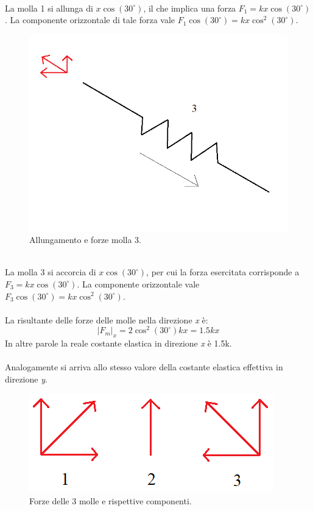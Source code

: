 \\
La molla 1 si allunga di $x\cos(30^\circ)$, il che implica una forza $F_{1}=k x\cos(30^\circ)$. La componente orizzontale di tale forza vale $F_{1}\cos(30^\circ)=k x\cos^2(30^\circ)$.
\\
\begin{figure}[h]
    \centering
    \includegraphics[scale=0.4]{Immagini/Molla 3.png}
    \caption{Allungamento e forze molla 3.}
    \label{Molla3}
\end{figure}
\\
La molla 3 si accorcia di $x\cos(30^\circ)$, per cui la forza esercitata corrisponde a $F_{3}=k x\cos(30^\circ)$. La componente orizzontale vale $F_{3}\cos(30^\circ)=k x\cos^2(30^\circ)$.
\\\\
La risultante delle forze delle molle nella direzione \textit {x} è:
\begin{equation}
    |F_m|_x=2\cos^2(30^{\circ})k x=1.5k x
\end{equation}
In altre parole la reale costante elastica in direzione \textit {x} è 1.5k.
\\\\
Analogamente si arriva allo stesso valore della costante elastica effettiva in direzione \textit {y}.
\\
\begin{figure}[h]
    \centering
    \includegraphics[scale=0.6]{Immagini/TreForze.png}
    \caption{Forze delle 3 molle e rispettive componenti.}
    \label{TreForze}
\end{figure}
